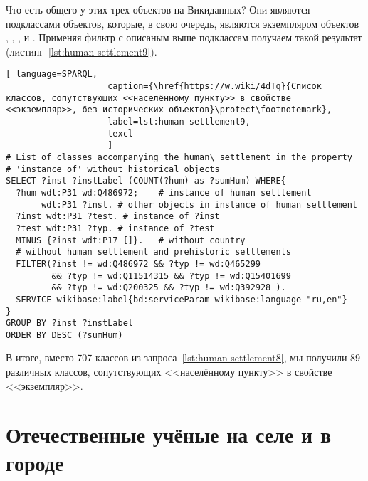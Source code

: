 Что есть общего у этих трех объектов на Викиданных? Они являются подклассами объектов, которые, в свою очередь, являются экземпляром объектов , , ,  и . Применяя фильтр с описаным выше подклассам получаем такой результат (листинг~\ref{lst:human-settlement9}).

\lstset{numbers=left, firstnumber=1, frame=single}
\begin{lstlisting}[ language=SPARQL, 
                    caption={\href{https://w.wiki/4dTq}{Cписок классов, сопутствующих <<населённому пункту>> в свойстве <<экземпляр>>, без исторических объектов}\protect\footnotemark},
                    label=lst:human-settlement9,
                    texcl 
                    ]
# List of classes accompanying the human\_settlement in the property
# 'instance of' without historical objects 
SELECT ?inst ?instLabel (COUNT(?hum) as ?sumHum) WHERE{
  ?hum wdt:P31 wd:Q486972;    # instance of human settlement
       wdt:P31 ?inst. # other objects in instance of human settlement
  ?inst wdt:P31 ?test. # instance of ?inst
  ?test wdt:P31 ?typ. # instance of ?test
  MINUS {?inst wdt:P17 []}.   # without country
  # without human settlement and prehistoric settlements
  FILTER(?inst != wd:Q486972 && ?typ != wd:Q465299 
         && ?typ != wd:Q11514315 && ?typ != wd:Q15401699 
         && ?typ != wd:Q200325 && ?typ != wd:Q392928 ). 
  SERVICE wikibase:label{bd:serviceParam wikibase:language "ru,en"}
}
GROUP BY ?inst ?instLabel
ORDER BY DESC (?sumHum)
\end{lstlisting}%

В итоге, вместо 707 классов из запроса~\ref{lst:human-settlement8}, 
мы получили 89 различных классов, сопутствующих <<населённому пункту>> в свойстве <<экземпляр>>. 

\section{Отечественные учёные на селе и в городе}

